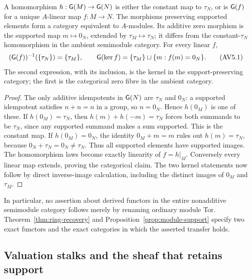 \begin{proposition}
\label{prop:module-support}
A homomorphism $h:\mathsf G(M)\to\mathsf G(N)$ is either the constant map to
$\tau_N$, or is $\mathsf G(f)$ for a unique $A$-linear map $f:M\to N$.
The morphisms preserving supported elements form a category equivalent
to $A$-modules. Its additive zero morphism is the supported map
$m\mapsto0_N$, extended by $\tau_M\mapsto\tau_N$; it differs from the
constant-$\tau_N$ homomorphism in the ambient semimodule category.
For every linear $f$,
\[
 (\mathsf G(f))^{-1}(\{\tau_N\})=\{\tau_M\},\qquad
 \mathsf G(\ker f)=\{\tau_M\}\sqcup\{m:f(m)=0_N\}.
 \tag{AV5.1}\label{eq:module-kernels}
\]
The second expression, with its inclusion, is the kernel in the
support-preserving category; the first is the categorical zero fibre
in the ambient category.
\end{proposition}
\begin{proof}
The only additive idempotents in $\mathsf G(N)$ are $\tau_N$ and $0_N$:
a supported idempotent satisfies $n+n=n$ in a group, so $n=0_N$.
Hence $h(0_M)$ is one of these. If $h(0_M)=\tau_N$, then
$h(m)+h(-m)=\tau_N$ forces both summands to be $\tau_N$, since any
supported summand makes a sum supported. This is the constant map.
If $h(0_M)=0_N$, the identity $0_M+m=m$ rules out $h(m)=\tau_N$,
because $0_N+\tau_N=0_N\ne\tau_N$. Thus all supported elements have
supported images. The homomorphism laws become exactly linearity of
$f=h|_M$. Conversely every linear map extends, proving the categorical
claim. The two kernel statements now follow by direct inverse-image
calculation, including the distinct images of $0_M$ and $\tau_M$.
\end{proof}

In particular, no assertion about derived functors in the entire
nonadditive semimodule category follows merely by renaming ordinary
module Tor. Theorem~\ref{thm:ring-recovery} and
Proposition~\ref{prop:module-support} specify two exact functors and
the exact categories in which the asserted transfer holds.

\subsection{Valuation stalks and the sheaf that retains support}


